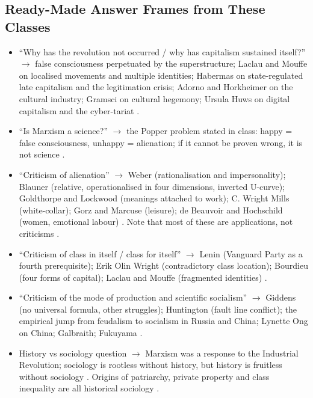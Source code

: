 \subsection{Ready-Made Answer Frames from These Classes}
\begin{itemize}
    \item ``Why has the revolution not occurred / why has capitalism sustained itself?'' $\rightarrow$ false consciousness perpetuated by the superstructure; Laclau and Mouffe on localised movements and multiple identities; Habermas on state-regulated late capitalism and the legitimation crisis; Adorno and Horkheimer on the cultural industry; Gramsci on cultural hegemony; Ursula Huws on digital capitalism and the cyber-tariat .
    \item ``Is Marxism a science?'' $\rightarrow$ the Popper problem stated in class: happy = false consciousness, unhappy = alienation; if it cannot be proven wrong, it is not science .
    \item ``Criticism of alienation'' $\rightarrow$ Weber (rationalisation and impersonality); Blauner (relative, operationalised in four dimensions, inverted U-curve); Goldthorpe and Lockwood (meanings attached to work); C. Wright Mills (white-collar); Gorz and Marcuse (leisure); de Beauvoir and Hochschild (women, emotional labour) . Note that most of these are applications, not criticisms .
    \item ``Criticism of class in itself / class for itself'' $\rightarrow$ Lenin (Vanguard Party as a fourth prerequisite); Erik Olin Wright (contradictory class location); Bourdieu (four forms of capital); Laclau and Mouffe (fragmented identities) .
    \item ``Criticism of the mode of production and scientific socialism'' $\rightarrow$ Giddens (no universal formula, other struggles); Huntington (fault line conflict); the empirical jump from feudalism to socialism in Russia and China; Lynette Ong on China; Galbraith; Fukuyama .
    \item History vs sociology question $\rightarrow$ Marxism was a response to the Industrial Revolution; sociology is rootless without history, but history is fruitless without sociology . Origins of patriarchy, private property and class inequality are all historical sociology .
\end{itemize}